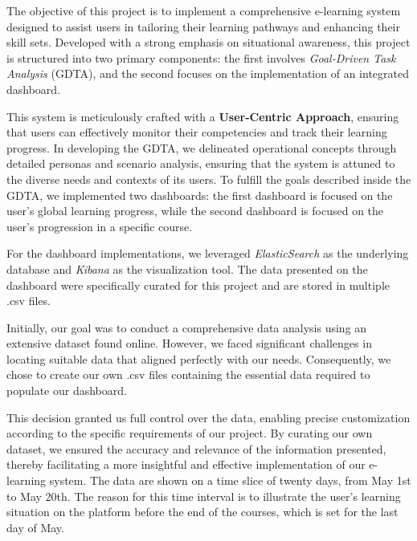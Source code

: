 The objective of this project is to implement a comprehensive e-learning system designed to assist users 
in tailoring their learning pathways and enhancing their skill sets. Developed with a strong emphasis on 
situational awareness, this project is structured into two primary components: the first involves 
\textit{Goal-Driven Task Analysis} (GDTA), and the second focuses on the implementation of an integrated dashboard.

This system is meticulously crafted with a \textbf{User-Centric Approach}, ensuring that users can effectively 
monitor their competencies and track their learning progress. In developing the GDTA, we delineated operational 
concepts through detailed personas and scenario analysis, ensuring that the system is attuned to the diverse needs 
and contexts of its users. To fulfill the goals described inside the GDTA, we implemented two dashboards: the first
dashboard is focused on the user's global learning progress, while the second dashboard is focused on the user's
progression in a specific course.

For the dashboard implementations, we leveraged \textit{ElasticSearch} as the underlying database and \textit{Kibana} 
as the visualization tool. The data presented on the dashboard were specifically curated for this project and are 
stored in multiple .csv files. 

Initially, our goal was to conduct a comprehensive data analysis using an extensive dataset found online. However, 
we faced significant challenges in locating suitable data that aligned perfectly with our needs. Consequently, we 
chose to create our own .csv files containing the essential data required to populate our dashboard. 

This decision granted us full control over the data, enabling precise customization according to the specific 
requirements of our project. By curating our own dataset, we ensured the accuracy and relevance of the information 
presented, thereby facilitating a more insightful and effective implementation of our e-learning system. The data 
are shown on a time slice of twenty days, from May 1st to May 20th. The reason for 
this time interval is to illustrate the user's learning situation on the platform before the end of the courses,
which is set for the last day of May. 

